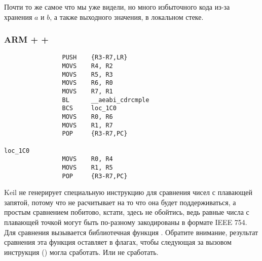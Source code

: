 Почти то же самое что мы уже видели, но много избыточного кода из-за хранения $a$ и $b$, а также 
выходного значения, в локальном стеке.

\subsubsection{ARM + \OptimizingKeil + \ThumbMode}

\begin{lstlisting}
                PUSH    {R3-R7,LR}
                MOVS    R4, R2
                MOVS    R5, R3
                MOVS    R6, R0
                MOVS    R7, R1
                BL      __aeabi_cdrcmple
                BCS     loc_1C0
                MOVS    R0, R6
                MOVS    R1, R7
                POP     {R3-R7,PC}

loc_1C0
                MOVS    R0, R4
                MOVS    R1, R5
                POP     {R3-R7,PC}
\end{lstlisting}

Keil не генерирует специальную инструкцию для сравнения чисел с плавающей запятой, потому что не 
расчитывает на то что она будет поддерживаться, а простым сравнением побитово, кстати, здесь не обойтись,
ведь равные числа с плавающей точкой могут быть по-разному закодированы в формате IEEE 754. 
Для сравнения вызывается библиотечная функция . Обратите внимание, результат
сравнения эта функция оставляет в флагах, чтобы следующая за вызовом инструкция  () могла сработать. Или не сработать.

 
